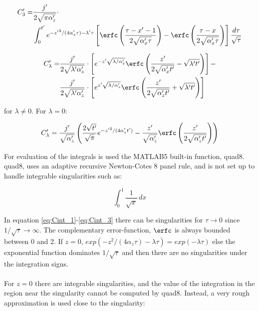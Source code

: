 \begin{equation}
\begin{split}
C'_3= & \frac{j'}{2\sqrt{\pi\alpha'_z}} \cdot \\ &
\int_{0}^{t'}e^{{-z'}^2/(4\alpha'_z\tau)-\lambda'
  \tau}\left[\erfc\left(\frac{\tau-x'-1}{2\sqrt{\alpha'_x\tau}}\right)-\erfc\left(\frac{\tau-x}{2\sqrt{\alpha'_x\tau}}\right)\right]\frac{d
  \tau}{\sqrt{\tau}}
\end{split}
\label{eq:Cint_3}
\end{equation}

\begin{equation}
\begin{split}
C'_{\lambda}= & \frac{j'}{2\sqrt{\lambda' \alpha'_z}}\cdot
\left[e^{-z'\sqrt{\lambda /\alpha'_z}}
\erfc\left(\frac{z'}{2\sqrt{\alpha'_xt'}}-\sqrt{\lambda'
    t'}\right)\right] - \\ &  \frac{j'}{2\sqrt{\lambda' \alpha'_z}}\cdot \left[
e^{z'\sqrt{\lambda/\alpha'_z}}\erfc\left(\frac{z'}{2\sqrt{\alpha'_z
    t'}}+\sqrt{\lambda' t'}\right)\right]
\end{split}
\label{eq:C_lambda}
\end{equation}

for $\lambda \neq 0$. For $\lambda=0$:

\begin{equation}
C'_{\lambda}=\frac{j' }{\sqrt{\alpha'_z}}
\left(\frac{2\sqrt{t'}}{\sqrt{\pi}}e^{{-z'}^2/(4\alpha'_zt')}-\frac{z'}{\sqrt{\alpha'_z}}\erfc\left(\frac{z'}{2\sqrt{\alpha'_zt'}}\right)\right)
\label{eq:C_lambda0}
\end{equation}

For evaluation of the integrals is used the MATLAB5 built-in function,
\textsf{quad8}. \textsf{quad8},
\cite{MATLABfuncref} uses an adaptive recursive Newton-Cotes 8 panel
rule, and is not set up to handle integrable singularities such as:


\begin{equation}
\int_{0}^{1}\frac{1}{\sqrt{x}}\, dx
\end{equation}

In equation \ref{eq:Cint_1}-\ref{eq:Cint_3} there can be singularities
for $\tau \rightarrow 0$ since $1/\sqrt{\tau} \rightarrow \infty$. The
complementary error-function, $\erfc$ is always bounded between 0 and
2. If $z=0$, $exp(-z^2/(4\alpha_z\tau)-\lambda\tau)=exp(-\lambda
\tau)$ else the exponential function dominates $1/\sqrt{\tau}$
and then there are no singularities under the integration signs.\\
\\
For $z=0$ there are integrable singularities, and the value of the
integration in the region near the singularity cannot be computed by
\textsf{quad8}. Instead, a very rough approximation is used close to
the singularity:

